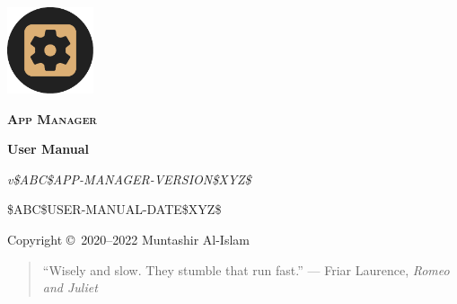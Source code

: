 \begin{titlingpage}
    \pagecolor{SunTan}
    \begin{center}
        \includegraphics[width=1in]{images/icon}\par\vspace{1cm}
        {\Huge\textbf{\textsc{App Manager}}\par}
        \vspace{2.5cm}
        {\huge\bfseries User Manual\par}
        \vspace{.5cm}
        {\Large\itshape v\$ABC\$APP-MANAGER-VERSION\$XYZ\$\par}
        \vfill
        {\large \$ABC\$USER-MANUAL-DATE\$XYZ\$\par}
        \vfill
        {Copyright \copyright\ 2020--2022 Muntashir Al-Islam\par}
        \pagebreak
        \pagecolor{white}
        \begin{quotation}
            ``Wisely and slow. They stumble that run fast.''
                {--- Friar Laurence, \textit{Romeo and Juliet}}
        \end{quotation}
    \end{center}
\end{titlingpage}
